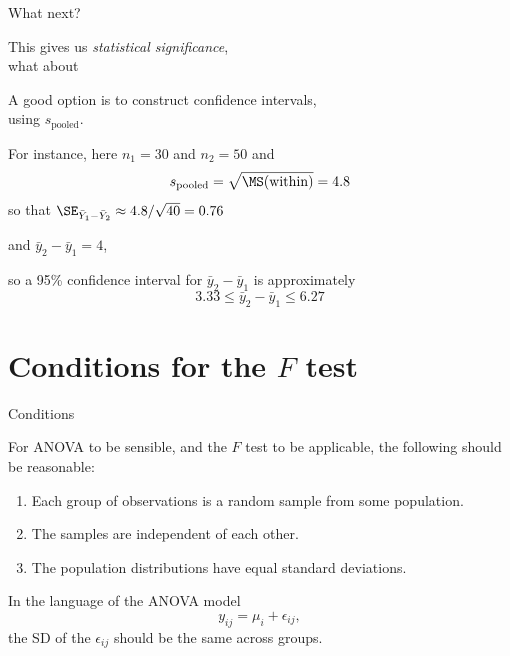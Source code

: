   \begin{frame}{What next?}

    This gives us \emph{statistical significance},\\
    what about 

    \vspace{2em}

    A good option is to construct \alert{confidence intervals},\\
    using $s_\text{pooled}$.

    \vspace{2em}

    For instance, here $n_1=30$ and $n_2=50$ and
    \[
    s_\text{pooled} = \sqrt{\MS(\text{within})} = 4.8
    \]
    so that $\SE_{\bar Y_1 - \bar Y_2} \approx 4.8 / \sqrt{40} =0.76$

    \vspace{1em}

    and $\bar y_2 - \bar y_1 = 4$,

    \vspace{1em}

    so a 95\% confidence interval for $\bar y_2 - \bar y_1$ is approximately
    \[
  3.33 \le \bar y_2 - \bar y_1 \le 6.27
  \]


  \end{frame}


\section{Conditions for the $F$ test}


\begin{frame}{Conditions}

    For ANOVA to be sensible, and the $F$ test to be applicable, the following should be reasonable:
    \begin{enumerate}
        \item Each group of observations is a random sample from some population.
        \item The samples are independent of each other.
        \item The population distributions have equal standard deviations.
    \end{enumerate}

    \vspace{2em}

    In the language of the ANOVA model
    \[
        y_{ij} = \mu_i + \epsilon_{ij} ,
    \]
    the SD of the $\epsilon_{ij}$ should be the same across groups.


\end{frame}


